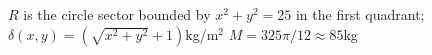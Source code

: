 {$R$ is the circle sector bounded by $x^2+y^2=25$ in the first quadrant; $\delta(x,y) = (\sqrt{x^2+y^2}+1)$kg/m$^2$
}
{$M = 325\pi/12\approx 85$kg%
}